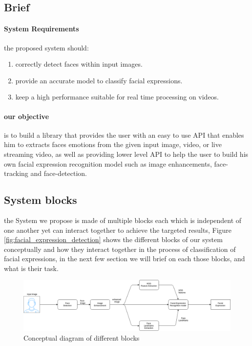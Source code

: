\subsection{Brief}
\paragraph{System Requirements}
the proposed system should:
\begin{enumerate}
	\item correctly detect faces within input images.
	\item provide an accurate model to classify facial expressions.
	\item keep a high performance suitable for real time processing on videos.
\end{enumerate}
\paragraph{our objective} is to build a library that provides the user with an easy to use API that enables him to extracts faces emotions from the given input image, video, or live streaming video, as well as providing lower level API to help the user to build his own facial expression recognition model such as image enhancements, face-tracking and face-detection.
\subsection{System blocks}
the System we propose is made of multiple blocks each which is independent of one another yet can interact together to achieve the targeted results, Figure 
\ref{fig:facial_expression_detection} shows the different blocks of our system conceptually and how they interact together in the process of classification of facial expressions, in the next few section we will brief on each those blocks, and what is their task. 

\begin{figure}
	\centering
	\includegraphics[width=\textwidth]{images/facial_expression_detection.png}
	\caption{Conceptual diagram of different blocks}
	\label{fig:facial_expression_recognition}
\end{figure}

